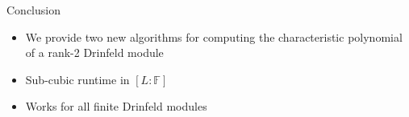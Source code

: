 \documentclass{beamer}
\newcommand{\f}{\mathbb{F}}
\begin{document}


    


\begin{frame}{Conclusion}

\begin{itemize}
    \item We provide two new algorithms for computing the characteristic polynomial of a rank-2 Drinfeld module
    \item Sub-cubic runtime in $[L:\f]$
    \item Works for all finite Drinfeld modules
\end{itemize}
    
\end{frame}





\end{document}
